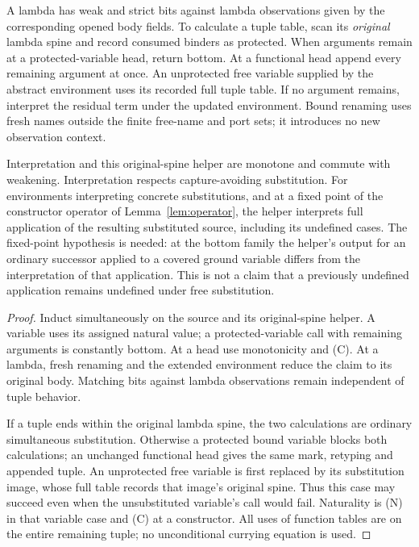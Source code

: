 A lambda has weak and strict bits against lambda observations given by
the corresponding opened body fields. To calculate a tuple table, scan
its \emph{original} lambda spine and record consumed binders as protected.
When arguments remain at a protected-variable head, return bottom.
At a functional head append every remaining argument at once.
An unprotected free variable supplied by the abstract environment uses
its recorded full tuple table. If no argument remains, interpret the
residual term under the updated environment. Bound renaming uses fresh
names outside the finite free-name and port sets; it introduces no new
observation context.

\begin{lemma}\label{lem:structural-interpretation}
Interpretation and this original-spine helper are monotone and commute
with weakening. Interpretation respects capture-avoiding substitution.
For environments interpreting concrete substitutions, and at a fixed
point of the constructor operator of Lemma~\ref{lem:operator}, the helper
interprets full application of the resulting substituted source,
including its undefined cases. The fixed-point hypothesis is needed:
at the bottom family the helper's output for an ordinary successor
applied to a covered ground variable differs from the interpretation
of that application. This is not a claim that a previously
undefined application remains undefined under free substitution.
\end{lemma}
\begin{proof}
Induct simultaneously on the source and its original-spine helper.
A variable uses its assigned natural value; a protected-variable call
with remaining arguments is constantly bottom. At a head use
monotonicity and (C). At a lambda, fresh renaming and the extended
environment reduce the claim to its original body. Matching bits
against lambda observations remain independent of tuple behavior.

If a tuple ends within the original lambda spine, the two calculations
are ordinary simultaneous substitution. Otherwise a protected bound
variable blocks both calculations; an unchanged functional head gives
the same mark, retyping and appended tuple. An unprotected free variable
is first replaced by its substitution image, whose full table records
that image's original spine. Thus this case may succeed even when the
unsubstituted variable's call would fail. Naturality is (N) in that
variable case and (C) at a constructor. All uses of function tables are
on the entire remaining tuple; no unconditional currying equation is used.
\end{proof}

